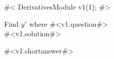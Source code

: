 

#<
DerivativesModule v1(1);
#>

Find $y'$ where #<v1.question#> \\


#<v1.solution#>

#<v1.shortanswer#>


